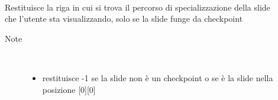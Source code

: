\begin{description}
\begin{description}
	\end{description}
	
	
	\begin{description}
		\item[\textbf{\color{blue+ enterInCheckPoint() : int			}] \hfill \\
			Restituisce la riga in cui si trova il percorso di specializzazione della slide che l'utente sta visualizzando, solo se la slide funge da checkpoint
			
		\begin{description}
			
			\item[Note] \hfill \\	
				\begin{itemize}
					\item restituisce -1 se la slide non è un checkpoint o se è la slide nella posizione [0][0]
				\end{itemize}
		\end{description}
			
	\end{description}
	
	

\end{description}





























